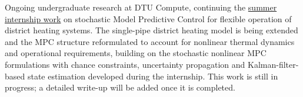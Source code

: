 
\begin{ProjectSummary}
Ongoing undergraduate research at DTU Compute, continuing the \href{project:dtu-internship-report}{summer internship work} on
stochastic Model Predictive Control for flexible operation of district heating systems.
The single-pipe district heating model is being extended and the MPC structure reformulated
to account for nonlinear thermal dynamics and operational requirements, building on the
stochastic nonlinear MPC formulations with chance constraints, uncertainty propagation and
Kalman-filter-based state estimation developed during the internship. This work is still in progress; a detailed write-up will be added once it is completed.
\end{ProjectSummary}
\ProjectDocument{}
